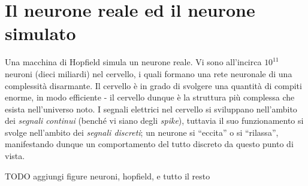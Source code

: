 \documentclass[10pt]{book}
\begin{document}
\section{Il neurone reale ed il neurone simulato}

Una macchina di Hopfield simula un neurone reale. Vi sono all'incirca $10^{11}$
neuroni (dieci miliardi) nel cervello, i quali formano una rete neuronale di
una complessità disarmante. Il cervello è in grado di svolgere una quantità di
compiti enorme, in modo efficiente \-- il cervello dunque è la struttura più
complessa che esista nell'universo noto. I segnali elettrici nel cervello si
sviluppano nell'ambito dei \emph{segnali continui} (benché vi siano degli
\emph{spike}), tuttavia il suo funzionamento si svolge nell'ambito dei
\emph{segnali discreti}; un neurone si ``eccita'' o si ``rilassa'',
manifestando dunque un comportamento del tutto discreto da questo punto di
vista.

TODO aggiungi figure neuroni, hopfield, e tutto il resto
\end{document}
